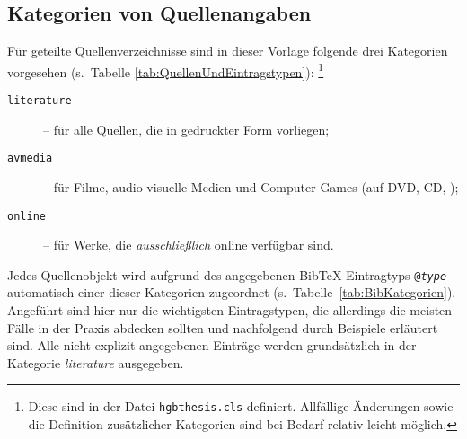 

\subsection{Kategorien von Quellenangaben}
\label{sec:BibKategorien}

Für geteilte Quellenverzeichnisse sind in dieser Vorlage folgende drei Kategorien vorgesehen
(s.\ Tabelle \ref{tab:QuellenUndEintragstypen}):%
\footnote{Diese sind in der Datei \nolinkurl{hgbthesis.cls} definiert.
Allfällige Änderungen sowie die Definition zusätzlicher Kategorien sind 
bei Bedarf relativ leicht möglich.}
%
\begin{description}
	\item[\texttt{literature}] -- für alle Quellen, die in gedruckter Form vorliegen;
	\item[\texttt{avmedia}] -- für Filme, audio-visuelle Medien und Computer Games (auf DVD, CD, \usw);
	\item[\texttt{online}] -- für Werke, die \emph{ausschließlich} online verfügbar sind.
\end{description}
%
Jedes Quellenobjekt wird aufgrund des angegebenen BibTeX-Eintragtyps 
\texttt{@\emph{type}} automatisch einer dieser Kategorien 
zugeordnet (s.\ Tabelle~\ref{tab:BibKategorien}).
Angeführt sind hier nur die wichtigsten Eintragstypen, die allerdings die meisten
Fälle in der Praxis abdecken sollten und nachfolgend durch Beispiele erläutert sind.
Alle nicht explizit angegebenen Einträge werden grundsätzlich in der Kategorie \emph{literature} 
ausgegeben.

